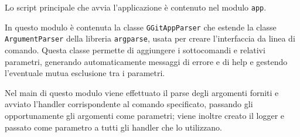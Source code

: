 Lo script principale che avvia l'applicazione è contenuto nel modulo \texttt{app}.

In questo modulo è contenuta la classe \texttt{GGitAppParser} che estende la classe \texttt{ArgumentParser} della libreria \texttt{argparse}, usata per creare l'interfaccia da linea di comando. Questa classe permette di aggiungere i sottocomandi e relativi parametri, generando automaticamente messaggi di errore e di help e gestendo l'eventuale mutua esclusione tra i parametri.

Nel main di questo modulo viene effettuato il parse degli argomenti forniti e avviato l'handler corrispondente al comando specificato, passando gli opportunamente gli argomenti come parametri; viene inoltre creato il logger e passato come parametro a tutti gli handler che lo utilizzano.